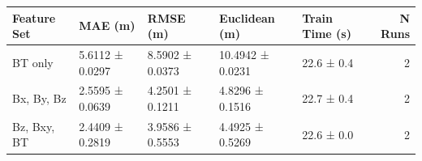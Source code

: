 \begin{tabular}{lllllr}
\toprule
Feature Set & MAE (m) & RMSE (m) & Euclidean (m) & Train Time (s) & N Runs \\
\midrule
BT only & 5.6112 ± 0.0297 & 8.5902 ± 0.0373 & 10.4942 ± 0.0231 & 22.6 ± 0.4 & 2 \\
Bx, By, Bz & 2.5595 ± 0.0639 & 4.2501 ± 0.1211 & 4.8296 ± 0.1516 & 22.7 ± 0.4 & 2 \\
Bz, Bxy, BT & 2.4409 ± 0.2819 & 3.9586 ± 0.5553 & 4.4925 ± 0.5269 & 22.6 ± 0.0 & 2 \\
\bottomrule
\end{tabular}
